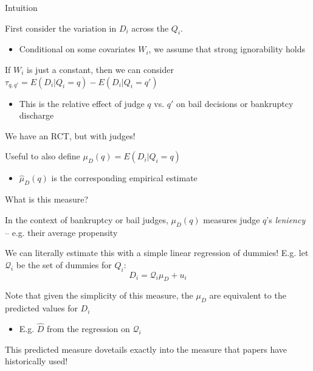 \documentclass[notes,11pt, aspectratio=169]{beamer}
\newenvironment{wideitemize}{\itemize\addtolength{\itemsep}{10pt}}{\enditemize}
\begin{document}
\begin{frame}{Intuition}
  \begin{wideitemize}
  \item First consider the variation in $D_{i}$ across the $Q_{i}$.
    \begin{itemize}
    \item Conditional on some covariates $W_{i}$, we assume that
      strong ignorability holds
    \end{itemize}
  \item If $W_{i}$ is just a constant, then we can consider
    $\tau_{q, q'} = E(D_{i} | Q_{i} = q) - E(D_{i} | Q_{i} = q')$
    \begin{itemize}
    \item This is the relative effect of judge $q$ vs. $q'$ on bail
      decisions or bankruptcy discharge 
    \end{itemize}
  \item We have an RCT, but with judges!
  \item Useful to also define $\mu_{D}(q) = E(D_{i}| Q_{i} = q)$
    \begin{itemize}
    \item     $\hat{\mu}_{D}(q)$ is the corresponding empirical estimate
    \end{itemize}
  \end{wideitemize}
\end{frame}

\begin{frame}{What is this measure? }
  \begin{wideitemize}
  \item In the context of bankruptcy or bail judges, $\mu_{D}(q)$
    measures judge $q$'s \emph{leniency} -- e.g. their average
    propensity
  \item We can literally estimate this with a simple linear regression of dummies! E.g. let $\mathcal{Q}_{i}$ be the set of dummies for $Q_{i}$:
    \begin{equation*}
      D_{i} = \mathcal{Q}_{i}\mu_{D} + u_{i}
    \end{equation*}
  \item Note that given the simplicity of this measure, the $\mu_{D}$ are equivalent to the predicted values for $D_{i}$
    \begin{itemize}
    \item E.g. $\hat{D}$ from the regression on $\mathcal{Q}_{i}$
    \end{itemize}
  \item This predicted measure dovetails exactly into the measure that
    papers have historically used!
  \end{wideitemize}
\end{frame}
\end{document}
